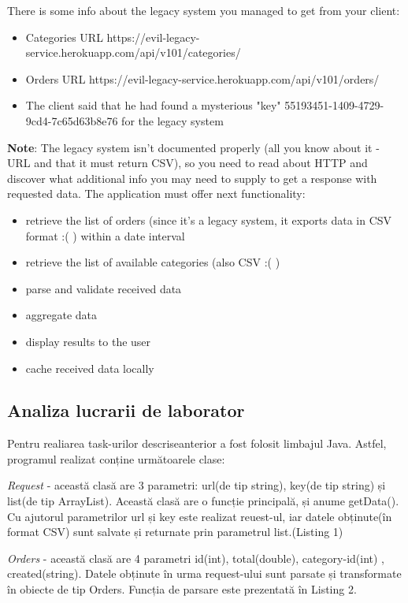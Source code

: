 There is some info about the legacy system you managed to get from your client:
\begin{itemize}
	\item Categories URL https://evil-legacy-service.herokuapp.com/api/v101/categories/
	\item Orders URL https://evil-legacy-service.herokuapp.com/api/v101/orders/
	\item The client said that he had found a mysterious "key" 55193451-1409-4729-9cd4-7c65d63b8e76 for the legacy system
\end{itemize}
\textbf{Note}: The legacy system isn't documented properly (all you know about it - URL and that it must return CSV), so you need to read about HTTP and discover what additional info you may need to supply to get a response with requested data.
The application must offer next functionality:
\begin{itemize}
	\item retrieve the list of orders (since it's a legacy system, it exports data in CSV format :( ) within a date interval
	\item retrieve the list of available categories (also CSV :( )
	\item parse and validate received data
	\item aggregate data
	\item  display results to the user
	\item cache received data locally
\end{itemize}

\subsection{Analiza lucrarii de laborator}

Pentru realiarea task-urilor descriseanterior a fost folosit limbajul Java. Astfel, programul realizat conține următoarele clase:

\textit{Request} - această clasă are 3 parametri: url(de tip string), key(de tip string) și list(de tip ArrayList). Această clasă are o funcție principală, și anume  getData(). Cu ajutorul parametrilor url și key este realizat reuest-ul, iar datele obținute(în format CSV) sunt salvate și returnate prin parametrul list.(Listing 1)

\textit{Orders} - această clasă are 4 parametri id(int), total(double), category-id(int)
, created(string). Datele obținute în urma request-ului sunt parsate și transformate în obiecte de tip Orders. Funcția de parsare este prezentată în Listing 2.

